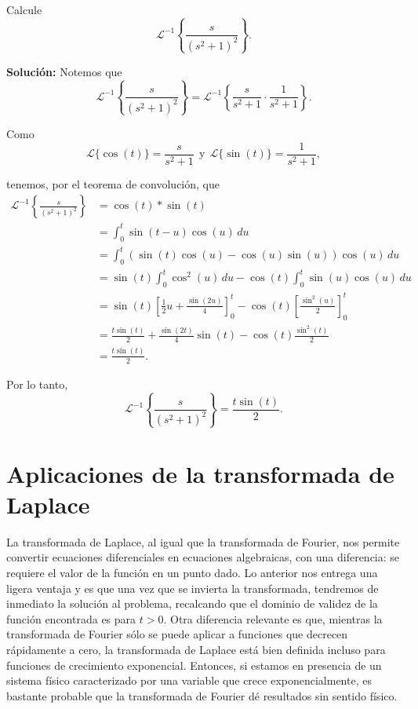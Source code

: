 \begin{ejemplo}
Calcule
$$\mathcal{L}^{-1} \left\{ \frac{s}{(s^2+1)^2} \right\}.$$

\textbf{Solución:} Notemos que 
\begin{equation*}
\mathcal{L}^{-1} \left\{ \frac{s}{(s^2+1)^2} \right\} = \mathcal{L}^{-1} \left\{ \frac{s}{s^2+1} \cdot \frac{1}{s^2+1} \right\}.
\end{equation*}

Como
\begin{equation*}
\mathcal{L}\{\cos(t)\} = \frac{s}{s^2+1} ~~\mbox{y}~~ \mathcal{L}\{\sin(t)\} = \frac{1}{s^2+1},
\end{equation*}

tenemos, por el teorema de convolución, que
\begin{align*}
    \mathcal{L}^{-1} \left\{ \frac{s}{(s^2+1)^2} \right\} &=\cos(t) *\sin(t)  \\
    &= \int_0^t \sin(t-u) \cos(u) \,du \\
    &= \int_0^t (\sin(t) \cos(u) - \cos(u) \sin(u)) \cos(u) \,du  \\
    &= \sin(t) \int_0^t \cos^2(u) \,du - \cos(t) \int_0^t \sin (u) \cos(u) \,du \\
    &= \sin(t) \left[ \frac{1}{2} u + \frac{\sin(2u)}{4} \right]_0^t - \cos(t) \left[ \frac{\sin^2(u)}{2} \right]_0^t \\
    &= \frac{t \sin(t)}{2} + \frac{\sin(2t)}{4} \sin(t) - \cos(t) \frac{\sin^2(t)}{2} \\
    &= \frac{t \sin(t) }{2}.
\end{align*}

Por lo tanto,
$$\mathcal{L}^{-1} \left\{ \frac{s}{(s^2+1)^2} \right\} = \frac{t \sin(t) }{2}.$$   
\end{ejemplo}

\section{Aplicaciones de la transformada de Laplace}

La transformada de Laplace, al igual que la transformada de Fourier, nos permite convertir ecuaciones diferenciales en ecuaciones algebraicas, con una diferencia: se requiere el valor de la función en un punto dado. Lo anterior nos entrega una ligera ventaja y es que una vez que se invierta la transformada, tendremos de inmediato la solución al problema, recalcando que el dominio de validez de la función encontrada es para $t > 0$. Otra diferencia relevante es que, mientras la transformada de Fourier sólo se puede aplicar a funciones que decrecen rápidamente a cero, la transformada de Laplace está bien definida incluso para funciones de crecimiento exponencial. Entonces, si estamos en presencia de un sistema físico caracterizado por una variable que crece exponencialmente, es bastante probable que la transformada de Fourier dé resultados sin sentido físico.

